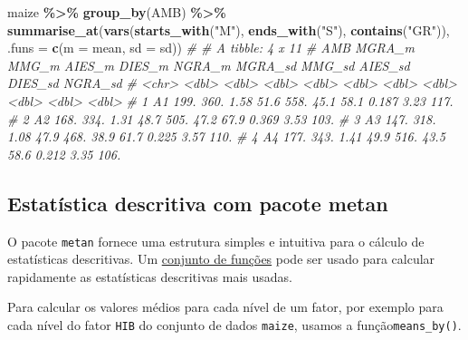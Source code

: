 \documentclass[
]{book}
\makeatletter
\newenvironment{Shaded}{\begin{snugshade}}{\end{snugshade}}
\newcommand{\CommentTok}[1]{\textcolor[rgb]{0.56,0.35,0.01}{\textit{#1}}}
\newcommand{\DataTypeTok}[1]{\textcolor[rgb]{0.13,0.29,0.53}{#1}}
\newcommand{\KeywordTok}[1]{\textcolor[rgb]{0.13,0.29,0.53}{\textbf{#1}}}
\newcommand{\NormalTok}[1]{#1}
\newcommand{\OperatorTok}[1]{\textcolor[rgb]{0.81,0.36,0.00}{\textbf{#1}}}
\newcommand{\StringTok}[1]{\textcolor[rgb]{0.31,0.60,0.02}{#1}}
\numberwithin{equation}{section}
\newcommand{\indf}[1]{\index[function]{#1@\texttt{#1()}|ST}}
\makeatother
\begin{document}
\begin{Shaded}
\begin{Highlighting}[]
\NormalTok{maize }\OperatorTok{\%\textgreater{}\%}
\StringTok{  }\KeywordTok{group\_by}\NormalTok{(AMB) }\OperatorTok{\%\textgreater{}\%}
\StringTok{  }\KeywordTok{summarise\_at}\NormalTok{(}\KeywordTok{vars}\NormalTok{(}\KeywordTok{starts\_with}\NormalTok{(}\StringTok{"M"}\NormalTok{),}
                    \KeywordTok{ends\_with}\NormalTok{(}\StringTok{"S"}\NormalTok{),}
                    \KeywordTok{contains}\NormalTok{(}\StringTok{"GR"}\NormalTok{)),}
               \DataTypeTok{.funs =} \KeywordTok{c}\NormalTok{(}\DataTypeTok{m =}\NormalTok{ mean, }\DataTypeTok{sd =}\NormalTok{ sd))}
\CommentTok{\# \# A tibble: 4 x 11}
\CommentTok{\#   AMB   MGRA\_m MMG\_m AIES\_m DIES\_m NGRA\_m MGRA\_sd MMG\_sd AIES\_sd DIES\_sd NGRA\_sd}
\CommentTok{\#   \textless{}chr\textgreater{}  \textless{}dbl\textgreater{} \textless{}dbl\textgreater{}  \textless{}dbl\textgreater{}  \textless{}dbl\textgreater{}  \textless{}dbl\textgreater{}   \textless{}dbl\textgreater{}  \textless{}dbl\textgreater{}   \textless{}dbl\textgreater{}   \textless{}dbl\textgreater{}   \textless{}dbl\textgreater{}}
\CommentTok{\# 1 A1      199.  360.   1.58   51.6   558.    45.1   58.1   0.187    3.23    117.}
\CommentTok{\# 2 A2      168.  334.   1.31   48.7   505.    47.2   67.9   0.369    3.53    103.}
\CommentTok{\# 3 A3      147.  318.   1.08   47.9   468.    38.9   61.7   0.225    3.57    110.}
\CommentTok{\# 4 A4      177.  343.   1.41   49.9   516.    43.5   58.6   0.212    3.35    106.}
\end{Highlighting}
\end{Shaded}

\hypertarget{dstat}{%
\subsection{Estatística descritiva com pacote metan}\label{dstat}}

O pacote \texttt{metan} fornece uma estrutura simples e intuitiva para o cálculo de estatísticas descritivas. Um \href{https://tiagoolivoto.github.io/metan/reference/utils_stats.html}{conjunto de funções} pode ser usado para calcular rapidamente as estatísticas descritivas mais usadas.

Para calcular os valores médios para cada nível de um fator, por exemplo para cada nível do fator \texttt{HIB} do conjunto de dados \texttt{maize}, usamos a função\texttt{means\_by()}.\indf{means\_by}
\end{document}

